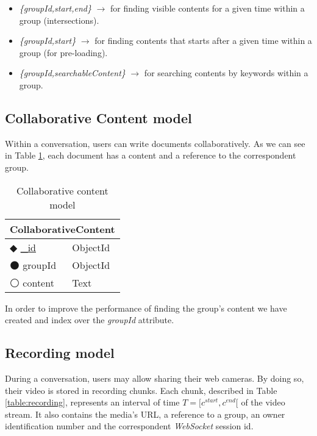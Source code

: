 \begin{itemize}
\item{\emph{\{groupId,start,end\}} $\rightarrow$ for finding visible contents for a given time  within a group (intersections).}
\item{\emph{\{groupId,start\}} $\rightarrow$  for finding contents that starts after a given time within a group (for pre-loading).}
\item{\emph{\{groupId,searchableContent\}} $\rightarrow$ for searching contents by keywords within a group.}  
\end{itemize}

\subsection{Collaborative Content model}

Within a conversation, users can write documents collaboratively. As we can see in Table \ref{table:collaborative}, each document has a content and a reference to the correspondent group. 


\begin{table}
\centering
    \caption{Collaborative content model}
    \label{table:collaborative}
    \begin{tabular}{|ll|}
        \hline
        \multicolumn{2}{|c|}{\textbf{CollaborativeContent}} \\ \hline
        $\Diamondblack$ \underline{\_id}  & ObjectId        \\ 
        $\medbullet$ groupId            & ObjectId          \\ 
        $\medcirc$ content            & Text                \\ \hline
    \end{tabular}
\end{table}

In order to improve the performance of finding the group's content we have created and index over the \emph{groupId} attribute.

\subsection{Recording model}

During a conversation, users may allow sharing their web cameras. By doing so, their video is stored in recording chunks. Each chunk, described in Table \ref{table:recording}, represents an interval of time $T=\big[c^{start},c^{end}\big[$ of the video stream. It also contains the media's \ac{URL}, a reference to a group, an owner identification number and the correspondent \emph{WebSocket} session id.
    

